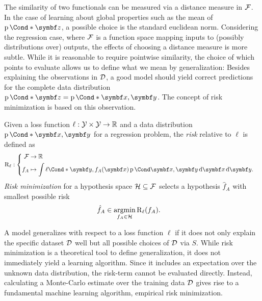The similarity of two functionals can be measured via a distance measure in $\mathcal{F}$.
In the case of learning about global properties such as the mean of $\Prob*{\mat{z}}$, a possible choice is the standard euclidean norm.
Considering the regression case, where $\mathcal{F}$ is a function space mapping inputs to (possibly distributions over) outputs, the effects of choosing a distance measure is more subtle.
While it is reasonable to require pointwise similarity, the choice of which points to evaluate allows us to define what we mean by generalization:
Besides explaining the observations in $\mathcal{D}$, a good model should yield correct predictions for the complete data distribution $\Prob*{\mat{z}} = \Prob*{\mat{x}, \mat{y}}$.
The concept of risk minimization is based on this observation.
\begin{definition}
    \label{def:risk_minimization}
    Given a loss function $\ell: \mathcal{Y} \times \mathcal{Y} \to \mathbb{R}$ and a data distribution $\Prob*{\mat{x}, \mat{y}}$ for a regression problem, the \emph{risk} relative to $\ell$ is defined as
    \begin{align}
        \risk_\ell & : \left\{
        \begin{aligned}
            \Fc & \to \Rb                                                                                              \\
            f_A & \mapsto \int \Fun*{\ell}{\mat{y}, f_A(\mat{x})} \Prob{\mat{x}, \mat{y}} \diff \mat{x} \diff \mat{y}.
        \end{aligned}
        \right.
    \end{align}
    \emph{Risk minimization} for a hypothesis space $\mathcal{H} \subseteq \mathcal{F}$ selects a hypothesis $\hat{f}_A$ with smallest possible risk
    \begin{align}
        \hat{f}_A & \in \operatorname*{argmin}_{f_A \in \mathcal{H}} \operatorname{R}_\ell(f_A).
    \end{align}
\end{definition}

A model generalizes with respect to a loss function $\ell$ if it does not only explain the specific dataset $\mathcal{D}$ well but all possible choices of $\mathcal{D}$ via $S$.
While risk minimization is a theoretical tool to define generalization, it does not immediately yield a learning algorithm.
Since it includes an expectation over the unknown data distribution, the risk-term cannot be evaluated directly.
Instead, calculating a Monte-Carlo estimate over the training data $\mathcal{D}$ gives rise to a fundamental machine learning algorithm, empirical risk minimization.


